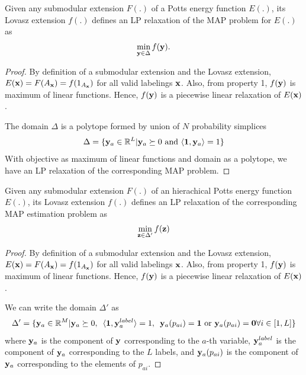 {\lemma Given any submodular extension $F(.)$ of a Potts energy function $E(.)$, its Lovasz extension $f(.)$ defines an LP relaxation of the MAP problem for $E(.)$ as 
\begin{align}
    \min_{{\bf y} \in \Delta} f({\bf y}).
\end{align}
\begin{proof}
    By definition of a submodular extension and the Lovasz extension, $E({\bf x}) = F(A_{\bf x}) = f(1_{A_{\bf x}})$ for all valid labelings ${\bf x}$. Also, from property 1, $f({\bf y})$ is maximum of linear functions. Hence, $f({\bf y})$ is a piecewise linear relaxation of $E({\bf x})$.

    The domain $\Delta$ is a polytope formed by union of $N$ probability simplices
\begin{equation}
    \Delta = \{{\bf y}_a \in \mathbb{R}^L | {\bf y}_a \succeq 0  \textrm{ and } \langle {\bf 1}, {\bf y}_a \rangle = 1\}
\end{equation}
With objective as maximum of linear functions and domain as a polytope, we have an LP relaxation of the corresponding MAP problem.
\end{proof}


{\lemma Given any submodular extension $F(.)$ of an hierachical Potts energy function $E(.)$, its Lovasz extension $f(.)$ defines an LP relaxation of the corresponding MAP estimation problem as
\begin{align}
    \min_{{\bf z} \in \Delta'} f({\bf z}) 
\end{align}

\begin{proof}
    By definition of a submodular extension and the Lovasz extension, $E({\bf x}) = F(A_{\bf x}) = f(1_{A_{\bf x}})$ for all valid labelings ${\bf x}$. Also, from property 1, $f({\bf y})$ is maximum of linear functions. Hence, $f({\bf y})$ is a piecewise linear relaxation of $E({\bf x})$.

    We can write the domain $\Delta'$ as 
    \begin{equation}
    \Delta' = \{ {\bf y}_a \in \mathbb{R}^M | {\bf y}_a \succeq 0, \enskip \langle {\bf 1}, {\bf y}_a^{label} \rangle = 1, \enskip {\bf y}_a(p_{ai}) = {\bf 1} \textrm{ or } {\bf y}_a(p_{ai}) = {\bf 0} \forall i \in [1, L]\}
    \end{equation} 
where ${\bf y}_a$ is the component of $\bf y$ corresponding to the $a$-th variable, ${\bf y}_a^{label}$  is the component of ${\bf y}_a$ corresponding to the $L$ labels, and ${\bf y}_a(p_{ai})$ is the component of ${\bf y}_a$ corresponding to the elements of $p_{ai}$. 


\end{proof}}}
